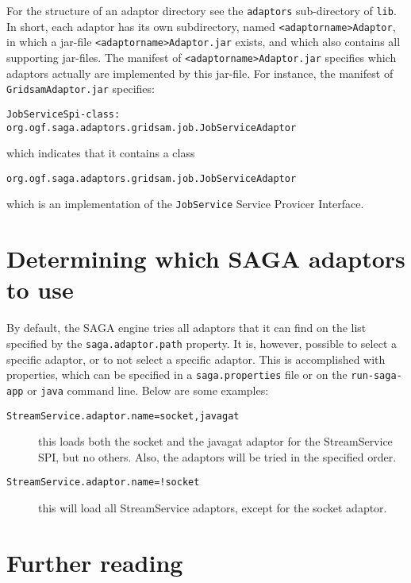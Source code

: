 \documentclass[a4paper,10pt]{article}
\begin{document}
For the structure of an adaptor directory see the \texttt{adaptors}
sub-directory of \texttt{lib}.
In short, each adaptor has its own subdirectory, named
\texttt{<adaptorname>Adaptor},
in which a jar-file
\texttt{<adaptorname>Adaptor.jar}
exists, and which also contains
all supporting jar-files.
The manifest of
\texttt{<adaptorname>Adaptor.jar} specifies which adaptors actually
are implemented by this jar-file. For instance, 
the manifest of \texttt{GridsamAdaptor.jar} specifies:

\noindent
{\small
\begin{verbatim}
JobServiceSpi-class: org.ogf.saga.adaptors.gridsam.job.JobServiceAdaptor
\end{verbatim}
}
\noindent

which indicates that it contains a class
\noindent
{\small
\begin{verbatim}
org.ogf.saga.adaptors.gridsam.job.JobServiceAdaptor
\end{verbatim}
}
\noindent
which is an implementation of the \texttt{JobService}
Service Provicer Interface.

\section{Determining which SAGA adaptors to use}

By default, the SAGA engine tries all adaptors that it can find on the list
specified by the \texttt{saga.adaptor.path} property.
It is, however, possible to select a specific
adaptor, or to not select a specific adaptor. This is accomplished
with properties, which can be specified in a \texttt{saga.properties} file or
on the \texttt{run-saga-app} or \texttt{java} command line.
Below are some examples:

\begin{description}

\item[\texttt{StreamService.adaptor.name=socket,javagat}]
this loads both the socket and the javagat adaptor for
the StreamService SPI, but no others. Also, the adaptors will
be tried in the specified order.

\item[\texttt{StreamService.adaptor.name=!socket}]
this will load all StreamService adaptors, except for the socket
adaptor.

\end{description}

\section{Further reading}
\end{document}
